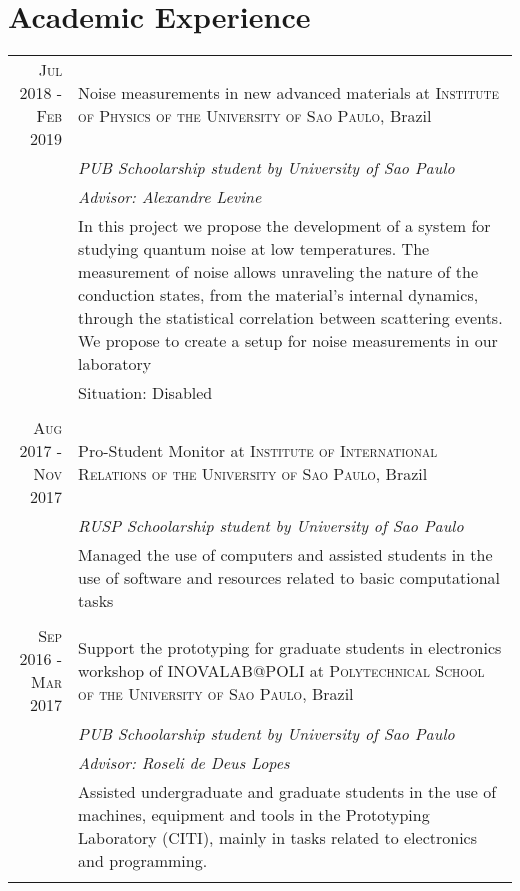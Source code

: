 \documentclass[a4paper,10pt]{article} %
\begin{document}
\section{Academic Experience}

\begin{tabular}{r|p{11cm}}

\textsc{Jul} 2018 - \textsc{Feb} 2019 &  Noise measurements in new advanced materials at \textsc{Institute of Physics of the University of Sao Paulo}, Brazil \\
&\emph{PUB Schoolarship student by University of Sao Paulo}\\
&\emph{Advisor: Alexandre Levine}\\
& \footnotesize{In this project we propose the development of a system for studying quantum noise at low temperatures. The measurement of noise allows unraveling the nature of the conduction states, from the material's internal dynamics, through the statistical correlation between scattering events. We propose to create a setup for noise measurements in our laboratory}\\
& \footnotesize{Situation: Disabled}\\
\multicolumn{2}{c}{} \\


\textsc{Aug} 2017 - \textsc{Nov} 2017 &  Pro-Student Monitor at \textsc{Institute of International Relations of the University of Sao Paulo}, Brazil \\
&\emph{RUSP Schoolarship student by University of Sao Paulo}\\
& \footnotesize{Managed the use of computers and assisted students in the use of software and resources related to basic computational tasks}\\
\multicolumn{2}{c}{} \\


\textsc{Sep} 2016 - \textsc{Mar} 2017 & Support the prototyping for graduate students in electronics workshop of INOVALAB@POLI at \textsc{Polytechnical School of the University of Sao Paulo}, Brazil \\
&\emph{PUB Schoolarship student by University of Sao Paulo}\\
&\emph{Advisor: Roseli de Deus Lopes}\\
& \footnotesize{Assisted undergraduate and graduate students in the use of machines, equipment and tools in the Prototyping Laboratory (CITI), mainly in tasks related to electronics and programming.}\\
\multicolumn{2}{c}{} \\


\end{tabular}
\end{document}
